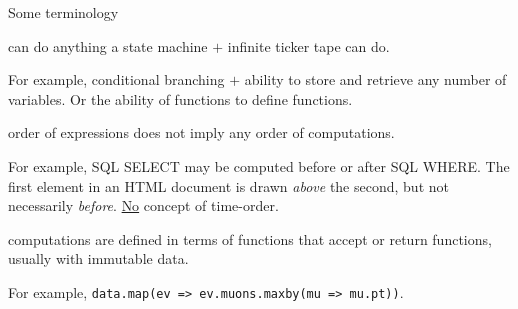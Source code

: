 \documentclass[aspectratio=169]{beamer}
\begin{document}
\begin{frame}{Some terminology}
\large
\vspace{0.5 cm}
\begin{description}\setlength{\itemsep}{0.5 cm}
\item[Turing complete:] can do anything a state machine $+$ infinite ticker tape can do.

\vspace{0.25 cm}
{\normalsize For example, conditional branching $+$ ability to store and retrieve any number of variables. Or the ability of functions to define functions.}

\item[Declarative:] order of expressions does not imply any order of computations.

\vspace{0.25 cm}
{\normalsize For example, SQL SELECT may be computed before or after SQL WHERE. The first element in an HTML document is drawn {\it above} the second, but not necessarily {\it before}. \underline{No} concept of time-order.}

\item[Functional:] computations are defined in terms of functions that accept or return functions, usually with immutable data.

\vspace{0.25 cm}
{\normalsize For example, \small\texttt{data.map(ev => ev.muons.maxby(mu => mu.pt))}\normalsize .}
\end{description}
\end{frame}
\end{document}
